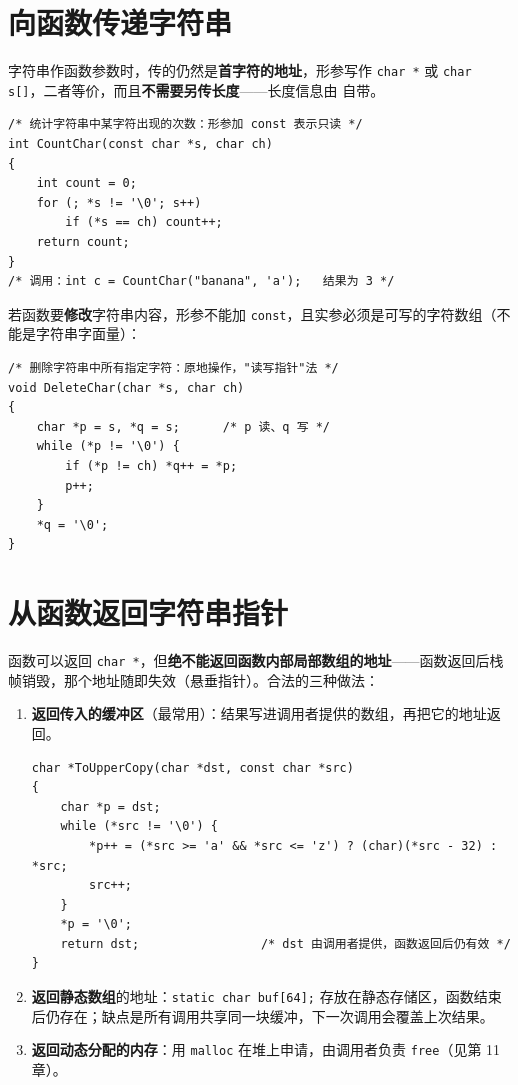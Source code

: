 
\section{向函数传递字符串}
字符串作函数参数时，传的仍然是\textbf{首字符的地址}，形参写作 \texttt{char *} 或 \texttt{char s[]}，二者等价，而且\textbf{不需要另传长度}——长度信息由 \nul 自带。
\begin{lstlisting}
/* 统计字符串中某字符出现的次数：形参加 const 表示只读 */
int CountChar(const char *s, char ch)
{
    int count = 0;
    for (; *s != '\0'; s++)
        if (*s == ch) count++;
    return count;
}
/* 调用：int c = CountChar("banana", 'a');   结果为 3 */
\end{lstlisting}
若函数要\textbf{修改}字符串内容，形参不能加 \texttt{const}，且实参必须是可写的字符数组（不能是字符串字面量）：
\begin{lstlisting}
/* 删除字符串中所有指定字符：原地操作，"读写指针"法 */
void DeleteChar(char *s, char ch)
{
    char *p = s, *q = s;      /* p 读、q 写 */
    while (*p != '\0') {
        if (*p != ch) *q++ = *p;
        p++;
    }
    *q = '\0';
}
\end{lstlisting}

\section{从函数返回字符串指针}
函数可以返回 \texttt{char *}，但\textbf{绝不能返回函数内部局部数组的地址}——函数返回后栈帧销毁，那个地址随即失效（悬垂指针）。合法的三种做法：

\begin{enumerate}
  \item \textbf{返回传入的缓冲区}（最常用）：结果写进调用者提供的数组，再把它的地址返回。
\begin{lstlisting}
char *ToUpperCopy(char *dst, const char *src)
{
    char *p = dst;
    while (*src != '\0') {
        *p++ = (*src >= 'a' && *src <= 'z') ? (char)(*src - 32) : *src;
        src++;
    }
    *p = '\0';
    return dst;                 /* dst 由调用者提供，函数返回后仍有效 */
}
\end{lstlisting}
  \item \textbf{返回静态数组}的地址：\texttt{static char buf[64];} 存放在静态存储区，函数结束后仍存在；缺点是所有调用共享同一块缓冲，下一次调用会覆盖上次结果。
  \item \textbf{返回动态分配的内存}：用 \texttt{malloc} 在堆上申请，由调用者负责 \texttt{free}（见第 11 章）。
\end{enumerate}

